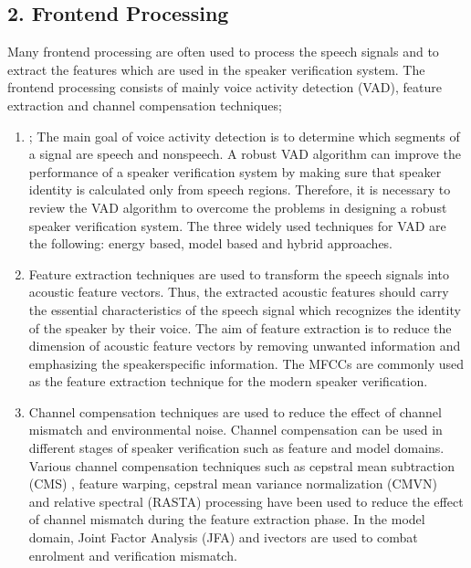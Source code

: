 \documentclass[letterpaper,10pt,english]{jupyterBook}
\begin{document}
\subsection{2. Front\sphinxhyphen{}end Processing}
\label{\detokenize{Recognition/Speaker_Recognition_and_Verification:front-end-processing}}
\sphinxAtStartPar
Many front\sphinxhyphen{}end processing are often used to process the speech signals
and to extract the features which are used in the speaker verification
system. The front\sphinxhyphen{}end processing consists of mainly voice activity
detection (VAD), feature extraction and channel compensation techniques;
\begin{enumerate}
%
\item {} 
\sphinxAtStartPar
{};
The main goal of voice activity detection is to determine which
segments of a signal are speech and non\sphinxhyphen{}speech. A robust VAD
algorithm can improve the performance of a speaker verification
system by making sure that speaker identity is calculated only from
speech regions. Therefore, it is necessary to review the VAD
algorithm to overcome the problems in designing a robust speaker
verification system. The three widely used techniques for VAD are
the following: energy based, model based and hybrid approaches.

\item {} 
\sphinxAtStartPar
Feature extraction techniques are used to transform the speech
signals into acoustic feature vectors. Thus, the extracted acoustic
features should carry the essential characteristics of the speech
signal which recognizes the identity of the speaker by their voice.
The aim of feature extraction is to reduce the dimension of acoustic
feature vectors by removing unwanted information and emphasizing the
speaker\sphinxhyphen{}specific information. The MFCCs are commonly used as the
feature extraction technique for the modern speaker verification.

\item {} 
\sphinxAtStartPar
Channel compensation techniques are used to reduce the effect of
channel mismatch and environmental noise. Channel compensation can
be used in different stages of speaker verification such as feature
and model domains. Various channel compensation techniques such as
cepstral mean subtraction (CMS) , feature warping, cepstral mean
variance normalization (CMVN)  and relative spectral (RASTA)
processing have been used to reduce the effect of channel mismatch
during the feature extraction phase. In the model domain, Joint
Factor Analysis (JFA) and i\sphinxhyphen{}vectors are used to combat enrolment and
verification mismatch.

\end{enumerate}
\end{document}
